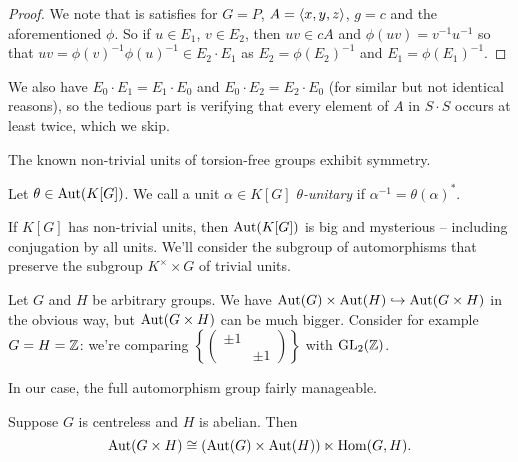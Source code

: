 \begin{proof}
    We note that  is satisfies for $G = P$, $A = \langle x, y, z \rangle$, $g = c$ and the aforementioned $\phi$.
    So if $u \in E_1$, $v \in E_2$, then $uv \in cA$ and $\phi(uv) = v^{-1} u^{-1}$ so that $uv = \phi(v)^{-1} \phi(u)^{-1} \in E_2 \cdot E_1$ as $E_2 = \phi(E_2)^{-1}$ and $E_1 = \phi(E_1)^{-1}$.
\end{proof}

We also have $E_0 \cdot E_1 = E_1 \cdot E_0$ and $E_0 \cdot E_2 = E_2 \cdot E_0$ (for similar but not identical reasons), so the tedious part is verifying that every element of $A$ in $S \cdot S$ occurs at least twice, which we skip.

The known non-trivial units of torsion-free groups exhibit symmetry.
\begin{definition}
    Let $\theta \in \mathrm{Aut}(K[G])$.
    We call a unit $\alpha \in K[G]$ \emph{$\theta$-unitary} if $\alpha^{-1} = \theta(\alpha)^*$.
\end{definition}
If $K[G]$ has non-trivial units, then $\mathrm{Aut}(K[G])$ is big and mysterious -- including conjugation by all units.
We'll consider the subgroup of automorphisms that preserve the subgroup $K^\times \times G$ of trivial units.

Let $G$ and $H$ be arbitrary groups.
We have $\mathrm{Aut}(G) \times \mathrm{Aut}(H) \hookrightarrow \mathrm{Aut}(G \times H)$ in the obvious way, but $\mathrm{Aut}(G \times H)$ can be much bigger.
Consider for example $G = H = \mathbb{Z}$: we're comparing $\left\{\left(\begin{smallmatrix} \pm 1 & \\ & \pm 1 \end{smallmatrix}\right)\right\}$ with $\mathrm{GL}_2(\mathbb{Z})$.

In our case, the full automorphism group fairly manageable.
\begin{proposition}
    \label{proposition:aut_of_centreless_times_abelian}
    Suppose $G$ is centreless and $H$ is abelian.
    Then \[
        \mathrm{Aut}(G \times H) \cong (\mathrm{Aut}(G) \times \mathrm{Aut}(H)) \ltimes \mathrm{Hom}(G, H).
    \]
\end{proposition}

